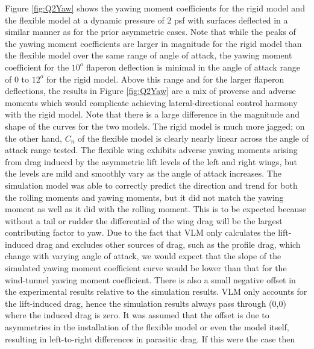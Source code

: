 \documentclass[11pt]{ucthesis}
\begin{document}
Figure \ref{fig:Q2Yaw} shows the yawing moment coefficients for the rigid model and the flexible model at a dynamic pressure of 2 psf with surfaces deflected in a similar manner as for the prior asymmetric cases. Note that while the peaks of the yawing moment coefficients are larger in magnitude for the rigid model than the flexible model over the same range of angle of attack, the yawing moment coefficient for the $10^o$ flaperon deflection is minimal in the angle of attack range of 0 to $12^o$ for the rigid model. Above this range and for the larger flaperon deflections, the results in Figure \ref{fig:Q2Yaw} are a mix of proverse and adverse moments which would complicate achieving lateral-directional control harmony with the rigid model. Note that there is a large difference in the magnitude and shape of the curves for the two models. The rigid model is much more jagged; on the other hand, $C_n$ of the flexible model is clearly nearly linear across the angle of attack range tested. The flexible wing exhibits adverse yawing moments arising from drag induced by the asymmetric lift levels of the left and right wings, but the levels are mild and smoothly vary as the angle of attack increases.
The simulation model was able to correctly predict the direction and trend for both the rolling moments and yawing moments, but it did not match the yawing moment as well as it did with the rolling moment. This is to be expected because without a tail or rudder the differential of the wing drag will be the largest contributing factor to yaw. Due to the fact that VLM only calculates the lift-induced drag and excludes other sources of drag, such as the profile drag, which change with varying angle of attack, we would expect that the slope of the simulated yawing moment coefficient curve would be lower than that for the wind-tunnel yawing moment coefficient. There is also a small negative offset in the experimental results relative to the simulation results. VLM only accounts for the lift-induced drag, hence the simulation results always pass through (0,0) where the induced drag is zero. It was assumed that the offset is due to asymmetries in the installation of the flexible model or even the model itself, resulting in left-to-right differences in parasitic drag. If this were the case then 
\end{document}
